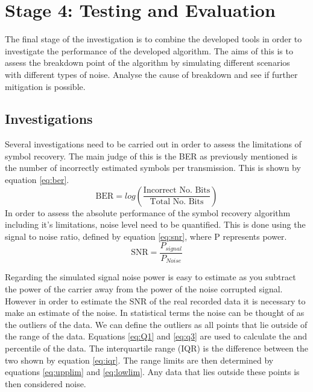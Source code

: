\section{Stage 4: Testing and Evaluation}
The final stage of the investigation is to combine the developed tools in order to investigate the performance of the developed algorithm. The aims of this is to assess the breakdown point of the algorithm by simulating different scenarios with different types of noise. Analyse the cause of breakdown and see if further mitigation is possible.
\subsection{Investigations}\label{sec:investigations}
Several investigations need to be carried out in order to assess the limitations of symbol recovery. The main judge of this is the BER as previously mentioned is the number of incorrectly estimated symbols per transmission. This is shown by equation \ref{eq:ber}.
\begin{equation}
    \text{BER} = log\left(\frac{\text{Incorrect No. Bits}}{\text{Total No. Bits}}\right)
    \label{eq:ber}
\end{equation}
In order to assess the absolute performance of the symbol recovery algorithm including it's limitations, noise level need to be quantified. This is done using the signal to noise ratio, defined by equation \ref{eq:snr}, where P represents power.
\begin{subequations}
\begin{equation}
    \text{SNR} = \frac{P_{signal}}{P_{Noise}}
    \label{eq:snr}
\end{equation}
\end{subequations}

Regarding the simulated signal noise power is easy to estimate as you subtract the power of the carrier away from the power of the noise corrupted signal. However in order to estimate the SNR of the real recorded data it is necessary to make an estimate of the noise. In statistical terms the noise can be thought of as the outliers of the data. We can define the outliers as all points that lie outside of the range of the data. Equations \ref{eq:Q1} and \ref{eq:q3} are used to calculate the  and  percentile of the data. The interquartile range (IQR) is the difference between the two shown by equation \ref{eq:iqr}. The range limits are then determined by equations \ref{eq:upplim} and \ref{eq:lowlim}. Any data that lies outside these points is then considered noise.

